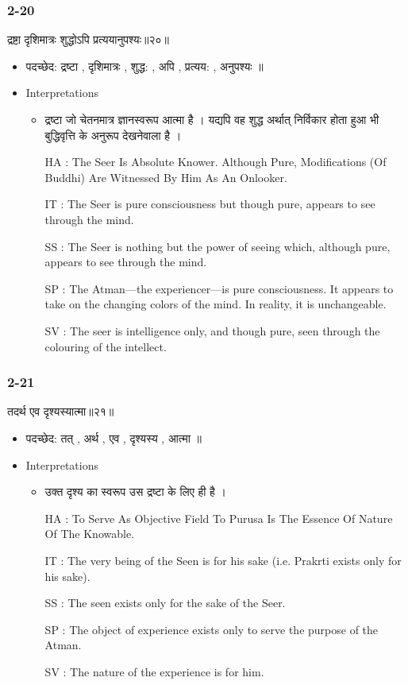 \begin{frame}[fragile]\frametitle{2-20}
\begin{sanskrit}
द्रष्टा दृशिमात्रः शुद्धोऽपि प्रत्ययानुपश्यः॥२०॥
\end{sanskrit}

	\begin{itemize}
	\item पदच्छेद: द्रष्टा , दृशिमात्रः , शुद्ध: , अपि , प्रत्यय: , अनुपश्यः ॥
	\item Interpretations
		\begin{itemize}
		\item द्रष्टा जो चेतनमात्र ज्ञानस्वरूप आत्मा है । यद्यपि वह शुद्ध अर्थात् निर्विकार होता हुआ भी बुद्धिवृत्ति के अनुरूप देखनेवाला है ।
		\item [HA]: The Seer Is Absolute Knower. Although Pure, Modifications (Of Buddhi) Are Witnessed By Him As An Onlooker.
		\item [IT]: The Seer is pure consciousness but though pure, appears to see through the mind.
		\item [SS]: The Seer is nothing but the power of seeing which, although pure, appears to see through the mind.
		\item [SP]: The Atman—the experiencer—is pure consciousness. It appears to take on the changing colors of the mind. In reality, it is unchangeable.
		\item [SV]: The seer is intelligence only, and though pure, seen through the colouring of the intellect. 
		\end{itemize}
	\end{itemize}
	
\end{frame}


\begin{frame}[fragile]\frametitle{2-21}
\begin{sanskrit}
तदर्थ एव दृश्यस्यात्मा॥२१॥
\end{sanskrit}

	\begin{itemize}
	\item पदच्छेद: तत् , अर्थ , एव , दृश्यस्य , आत्मा ॥
	\item Interpretations
		\begin{itemize}
		\item उक्त दृश्य का स्वरूप उस द्रष्टा के लिए ही है ।
		\item [HA]: To Serve As Objective Field To Purusa Is The Essence Of Nature Of The Knowable.
		\item [IT]: The very being of the Seen is for his sake (i.e. Prakrti exists only for his sake).
		\item [SS]: The seen exists only for the sake of the Seer.
		\item [SP]: The object of experience exists only to serve the purpose of the Atman.
		\item [SV]: The nature of the experience is for him. 
		\end{itemize}
	\end{itemize}
	
\end{frame}


